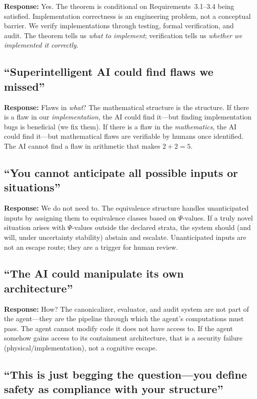 \documentclass[12pt]{article}
\theoremstyle{definition}
\begin{document}
\textbf{Response:} Yes. The theorem is conditional on Requirements~3.1--3.4 being satisfied. Implementation correctness is an engineering problem, not a conceptual barrier. We verify implementations through testing, formal verification, and audit. The theorem tells us \emph{what to implement}; verification tells us \emph{whether we implemented it correctly}.

\subsection{``Superintelligent AI could find flaws we missed''}

\textbf{Response:} Flaws in \emph{what}? The mathematical structure is the structure. If there is a flaw in our \emph{implementation}, the AI could find it---but finding implementation bugs is beneficial (we fix them). If there is a flaw in the \emph{mathematics}, the AI could find it---but mathematical flaws are verifiable by humans once identified. The AI cannot find a flaw in arithmetic that makes $2+2=5$.

\subsection{``You cannot anticipate all possible inputs or situations''}

\textbf{Response:} We do not need to. The equivalence structure handles unanticipated inputs by assigning them to equivalence classes based on $\Psi$-values. If a truly novel situation arises with $\Psi$-values outside the declared strata, the system should (and will, under uncertainty stability) abstain and escalate. Unanticipated inputs are not an escape route; they are a trigger for human review.

\subsection{``The AI could manipulate its own architecture''}

\textbf{Response:} How? The canonicalizer, evaluator, and audit system are not part of the agent---they are the pipeline through which the agent's computations must pass. The agent cannot modify code it does not have access to. If the agent somehow gains access to its containment architecture, that is a security failure (physical/implementation), not a cognitive escape.

\subsection{``This is just begging the question---you define safety as compliance with your structure''}
\end{document}
